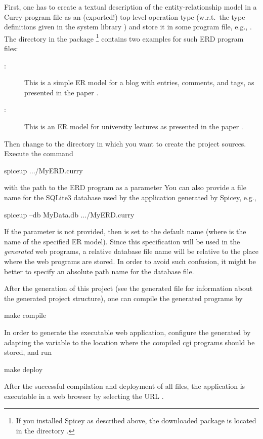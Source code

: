 First, one has to create a textual description of the
entity-relationship model
in a Curry program file as an (exported!) top-level operation type 
(w.r.t.\ the type definitions given in the system library
)
and store it in some program file, e.g., .
The directory  in the package \footnote{%
If you installed Spicey as described above,
the downloaded  package is located in the directory
.}
contains two examples for such ERD program files:
\begin{description}
\item[:]
This is a simple ER model for a blog with entries, comments,
and tags, as presented in the paper \cite{HanusKoschnicke14TPLP}.
\item[:]
This is an ER model for university lectures as
presented in the paper \cite{BrasselHanusMueller08PADL}.
\end{description}
%
Then change to the directory in which you want to create
the project sources.
Execute the command
\begin{curry}
spiceup .../MyERD.curry
\end{curry}
with the path to the ERD program as a parameter
You can also provide a file name for the SQLite3 database used
by the application generated by Spicey, e.g.,
\begin{curry}
spiceup --db MyData.db .../MyERD.curry
\end{curry}
If the parameter  is not provided,
then  is set to the default name 
(where  is the name of the specified ER model).
Since this specification will be used in the \emph{generated} web programs,
a relative database file name will be relative to the place where
the web programs are stored.
In order to avoid such confusion, it might be better to specify
an absolute path name for the database file.

After the generation of this project (see the generated file
 for information about the generated project structure),
one can compile the generated programs by
\begin{curry}
make compile
\end{curry}
In order to generate the executable web application,
configure the generated 
by adapting the variable  to the location
where the compiled cgi programs should be stored, and run
\begin{curry}
make deploy
\end{curry}
After the successful compilation and deployment of all files,
the application is executable
in a web browser by selecting the URL .
